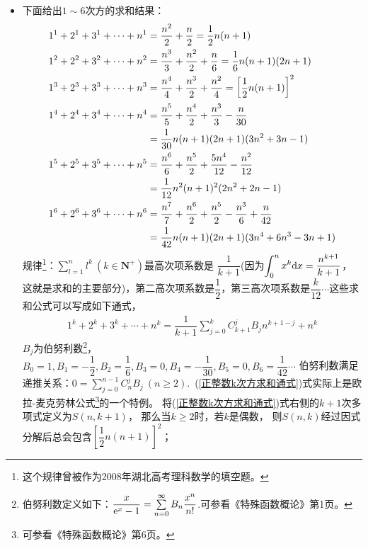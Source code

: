 \begin{itemize}[leftmargin=\inteval{\myitemleftmargin}pt,itemsep=
   \inteval{\myitemitempsep}pt,topsep=\inteval{\myitemtopsep}pt]
\item 下面给出$ 1\sim 6 $次方的求和结果：
\begin{align}
    1^1+2^1+3^1+\cdots +n^1 &=\dfrac{n^2}{2}+\dfrac{n}{2} =\dfrac{1}{2}n(n+1)
    \label{正整数1次方求和}\\
    1^2+2^2+3^2+\cdots +n^2&=\dfrac{n^3}{3}+\dfrac{n^2}{2}+\dfrac{n}{6}
    =\dfrac{1}{6}n(n+1)(2n+1)
    \label{正整数2次方求和} \\
    1^3+2^3+3^3+\cdots +n^3&=\dfrac{n^4}{4}+\dfrac{n^3}{2}+\dfrac{n^2}{4}=
    \left[\dfrac{1}{2}n(n+1) \right]^2 \label{正整数3次方求和}\\
    1^4+2^4+3^4+\cdots +n^4&=\dfrac{n^5}{5}+\dfrac{n^4}{2}+
    \dfrac{n^3}{3}-\dfrac{n}{30} 
            \label{正整数4次方求和} \\
    &=\dfrac{1}{30}n(n+1)(2n+1)(3n^2+3n-1) \notag\\
      1^5+2^5+3^5+\cdots +n^5&=\dfrac{n^6}{6}+\dfrac{n^5}{2}+
      \dfrac{5n^4}{12}-\dfrac{n^2}{12} \label{正整数5次方求和}\\
    &=\dfrac{1}{12}n^2(n+1)^2(2n^2+2n-1) \notag\\
    1^6+2^6+3^6+\cdots +n^6
    &=\dfrac{n^7}{7}+\dfrac{n^6}{2}+\dfrac{n^5}{2}-
    \dfrac{n^3}{6}+\dfrac{n}{42}
     \label{正整数6次方求和} \\
    &=\dfrac{1}{42}n(n+1)(2n+1)(3n^4+6n^3-3n+1)\notag 
\end{align}
规律\footnote{这个规律曾被作为2008年湖北高考理科数学的填空题。}：$ \sum\limits_{l=1}^{n} l^k \ (k\in \textbf{N}^+) $最高次项系数是
$ \dfrac{1}{k+1} $(因为$ \displaystyle \int_0^n x^k\mathrm{d} x=\dfrac{n^{k+1}}{k+1} $，
这就是求和的主要部分)，第二高次项系数是$ \dfrac{1}{2} $，第三高次项系数是$ \dfrac{k}{12} \cdots$这些求和公式可以写成如下通式，
\begin{align}\label{正整数k次方求和通式}
    1^k+2^k+3^k+\cdots +n^k=\dfrac{1}{k+1}
    \sum_{j=0}^{k}C_{k+1}^{j}B_{j}n^{k+1-j}+n^{k}
\end{align}
$ B_j $为伯努利数\footnote{伯努利数定义如下：$ \dfrac{x}{\mathrm{e}^x-1}=
    \sum\limits_{n=0}^{\infty}B_n\dfrac{x^n}{n!} $.可参看《特殊函数概论》第1页。}，
$ B_0=1,B_1=-\dfrac{1}{2},B_2=\dfrac{1}{6},B_3=0,B_4=-\dfrac{1}{30},
B_5=0,B_6=\dfrac{1}{42}\cdots$
伯努利数满足递推关系：$ 0=\sum\limits_{j=0}^{n-1}C_n^jB_j\ (n\geq 2) $.\ 
(\ref{正整数k次方求和通式})式实际上是欧拉-麦克劳林公式\footnote{可参看《特殊函数概论》第6页。}的一个特例。
将(\ref{正整数k次方求和通式})式右侧的$ k+1 $次多项式定义为$ S(n,k+1) $，
那么当$ k\geq 2 $时，若$k$是偶数，
则$ S(n,k) $经过因式分解后总会包含$ \left[\dfrac{1}{2}n(n+1)\right]^2 $；

\end{itemize}
